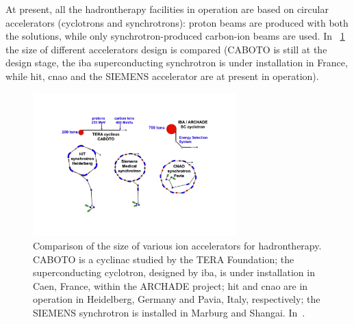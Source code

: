 At present, all the hadrontherapy facilities in operation are based on circular accelerators (cyclotrons and synchrotrons): proton beams are produced with both the solutions, while only synchrotron-produced carbon-ion beams are used. In \figurename~\ref{chap1::fig::acceleratorSize} the size of different accelerators design is compared (CABOTO is still at the design stage, the \gls{iba} superconducting synchrotron is under installation in France, while \gls{hit}, \gls{cnao} and the SIEMENS accelerator are at present in operation).

\begin{figure}[!htbp]
\centering
\includegraphics[width=0.7\textwidth]{03_GraphicFiles/chapter1_Introduction/acceleratorSize.pdf}
\caption{Comparison of the size of various ion accelerators for hadrontherapy. CABOTO is a cyclinac studied by the TERA Foundation; the superconducting cyclotron, designed by \gls{iba}, is under installation in Caen, France, within the ARCHADE project; \gls{hit} and \gls{cnao} are in operation in Heidelberg, Germany and Pavia, Italy, respectively; the SIEMENS synchrotron is installed in Marburg and Shangai. In~\cite{Amaldi2010}.}
\label{chap1::fig::acceleratorSize}
\end{figure} 

